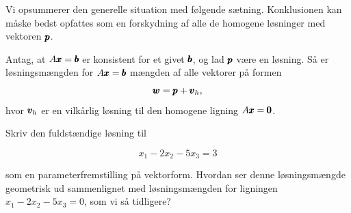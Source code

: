 Vi opsummerer den generelle situation med følgende sætning. Konklusionen kan måske bedst opfattes som en forskydning af alle de homogene løsninger med vektoren $\pmb{p}$.

\begin{theorem}
    Antag, at $A \pmb{x} = \pmb{b}$ er konsistent for et givet $\pmb{b}$, og lad $\pmb{p}$ være en løsning. Så er løsningsmængden for $A \pmb{x} = \pmb{b}$ mængden af alle vektorer på formen
    \[
    \pmb{w} = \pmb{p} + \pmb{v}_h,
    \]
    hvor $\pmb{v}_h$ er en vilkårlig løsning til den homogene ligning $A \pmb{x} = \pmb{0}$.
\end{theorem}

\begin{example} Skriv den fuldstændige løsning til

\[
x_1-2 x_2-5 x_3=3
\]

som en parameterfremstilling på vektorform. Hvordan ser denne løsningsmængde geometrisk ud sammenlignet med løsningsmængden for ligningen $x_1-2 x_2-5 x_3=0$, som vi så tidligere?
\end{example}

